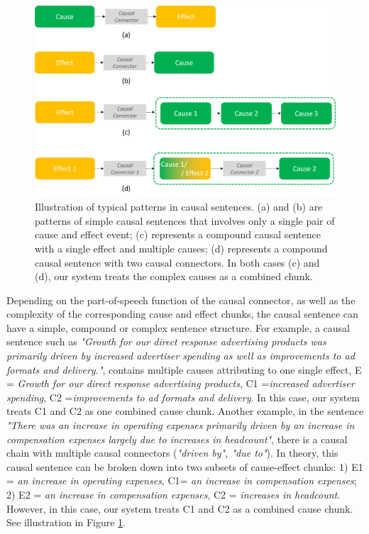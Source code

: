 \begin{figure}[h!]
\centering
  \includegraphics[scale=0.5]{figures/CausalBlocks.png}
  \caption{Illustration of typical patterns in causal sentences. (a) and (b) are patterns of simple causal sentences that involves only a single pair of cause and effect event; (c) represents a compound causal sentence with a single effect and multiple causes; (d) represents a compound causal sentence with two causal connectors. In both cases (c) and (d), our system treats the complex causes as a combined chunk.}
  \label{fig:blockpatterns}
\end{figure}


Depending on the part-of-speech function of the causal connector, as well as the complexity of the corresponding cause and effect chunks, the causal sentence can have a simple, compound or complex sentence structure. For example, a causal sentence such as \emph{"Growth for our direct response advertising products was primarily driven by increased advertiser spending as well as improvements to ad formats and delivery."}, contains multiple causes attributing to one single effect, E = \emph{Growth for our direct response advertising products}, C1 =\emph{increased advertiser spending}, C2 =\emph{improvements to ad formats and delivery}. In this case, our system treats C1 and C2 as one combined cause chunk. Another example, in the sentence \emph{"There was an increase in operating expenses primarily driven by an increase in compensation expenses largely due to increases in headcount"}, there is a causal chain with multiple causal connectors (\emph{"driven by", "due to"}). In theory, this causal sentence can be broken down into two subsets of cause-effect chunks: 1) E1 = \emph{an increase in operating expenses}, C1= \emph{an increase in compensation expenses}; 2) E2 = \emph{an increase in compensation expenses}, C2 = \emph{increases in headcount}. However, in this case, our system treats C1 and C2 as a combined cause chunk. See illustration in Figure \ref{fig:blockpatterns}.  


